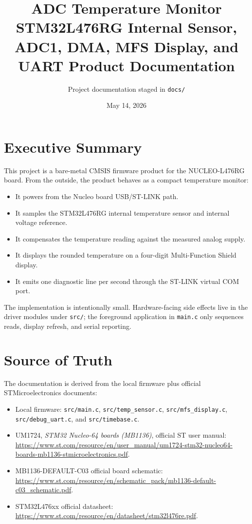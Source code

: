 \documentclass[11pt,a4paper]{article}
\title{ADC Temperature Monitor\\\large STM32L476RG Internal Sensor, ADC1, DMA, MFS Display, and UART Product Documentation}
\author{Project documentation staged in \texttt{docs/}}
\date{May 14, 2026}
\begin{document}
\maketitle
\tableofcontents
\newpage

\section{Executive Summary}

This project is a bare-metal CMSIS firmware product for the NUCLEO-L476RG board.
From the outside, the product behaves as a compact temperature monitor:

\begin{itemize}[leftmargin=*]
  \item It powers from the Nucleo board USB/ST-LINK path.
  \item It samples the STM32L476RG internal temperature sensor and internal voltage reference.
  \item It compensates the temperature reading against the measured analog supply.
  \item It displays the rounded temperature on a four-digit Multi-Function Shield display.
  \item It emits one diagnostic line per second through the ST-LINK virtual COM port.
\end{itemize}

The implementation is intentionally small. Hardware-facing side effects live in the
driver modules under \texttt{src/}; the foreground application in \texttt{main.c}
only sequences reads, display refresh, and serial reporting.

\section{Source of Truth}

The documentation is derived from the local firmware plus official
STMicroelectronics documents:

\begin{itemize}[leftmargin=*]
  \item Local firmware: \texttt{src/main.c}, \texttt{src/temp\_sensor.c},
        \texttt{src/mfs\_display.c}, \texttt{src/debug\_uart.c}, and
        \texttt{src/timebase.c}.
  \item UM1724, \emph{STM32 Nucleo-64 boards (MB1136)}, official ST user
        manual: \url{https://www.st.com/resource/en/user_manual/um1724-stm32-nucleo64-boards-mb1136-stmicroelectronics.pdf}.
  \item MB1136-DEFAULT-C03 official board schematic:
        \url{https://www.st.com/resource/en/schematic_pack/mb1136-default-c03_schematic.pdf}.
  \item STM32L476xx official datasheet:
        \url{https://www.st.com/resource/en/datasheet/stm32l476re.pdf}.
\end{itemize}
\end{document}
